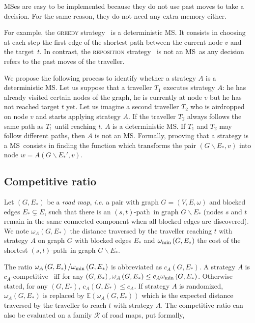 \documentclass[11pt,letterpaper]{article}
\newcommand{\stpath}{$(s,t)$-path}
\newcommand{\omegamin}{\omega_{\mbox{\scriptsize{min}}}}
\newcommand{\mts}{MS}
\begin{document}
\mts es are easy to be implemented because they do not use past moves to take a decision.  For the same reason, they do not need any extra memory either.

For example, the \textsc{greedy} strategy~\cite{XuHuSuZh09} is a deterministic \mts . It consists in choosing at each step the first edge of the shortest path between the current node $v$ and the target~$t$. 
In contrast, the \textsc{reposition} strategy~\cite{We08} is not an \mts ~as any decision refers to the past moves of the traveller. 

We propose the following process to identify whether a strategy $A$ is a deterministic \mts . Let us suppose that a traveller $T_1$ executes strategy $A$: he has already visited certain nodes of the graph, he is currently at node $v$ but he has not reached target $t$ yet. Let us imagine a second traveller $T_2$ who is airdropped on node $v$ and starts applying strategy $A$. If the traveller $T_2$ always follows the same path as $T_1$ until reaching $t$, $A$ is a deterministic \mts . If $T_1$ and $T_2$ may follow different paths, then $A$ is not an \mts . Formally, prooving that a strategy is a \mts ~consists in finding the function which transforms the pair $\left(G\backslash E_*,v\right)$ into node $w = A\left(G\backslash E_*',v\right)$.

\subsection{Competitive ratio} \label{subsec:compratio}

Let $\left(G,E_*\right)$ be a \textit{road map}, {\em i.e.} a pair with graph $G=\left(V,E,\omega\right)$ and blocked edges $E_* \subsetneq E$, such that there is an \stpath ~in graph $G\backslash E_*$ (nodes $s$ and $t$ remain in the same connected component when all blocked edges are discovered). We note $\omega_A\left(G,E_*\right)$ the distance traversed by the traveller reaching $t$ with strategy $A$ on graph $G$ with blocked edges $E_*$ and $\omegamin\left(G,E_*\right)$ the cost of the shortest \stpath ~in graph $G\backslash E_*$.

The ratio $\omega_A\left(G,E_*\right)/\omegamin\left(G,E_*\right)$ is abbreviated as $c_A\left(G,E_*\right)$. A strategy $A$ is $c_A$-competitive~\cite{BoEl98,XuHuSuZh09} iff for any $\left(G,E_*\right), \omega_A\left(G,E_*\right) \leq c_A \omegamin\left(G,E_*\right)$. Otherwise stated, for any $\left(G,E_*\right)$, $c_A\left(G,E_*\right) \leq c_A$. If strategy $A$ is randomized, $\omega_A\left(G,E_*\right)$ is replaced by $\mathbb{E}\left(\omega_A\left(G,E_*\right)\right)$ which is the expected distance traversed by the traveller to reach $t$ with strategy $A$. The competitive ratio can also be evaluated on a family $\mathcal{R}$ of road maps, put formally,
\end{document}
